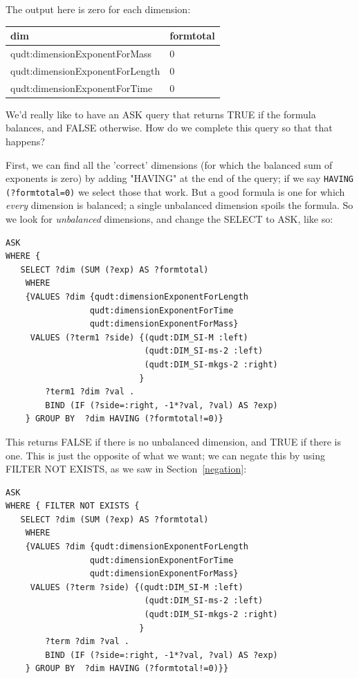 The output here is zero for each dimension:

\begin{tabular}{|ll|}
\hline
dim&formtotal\\
\hline
qudt:dimensionExponentForMass&0\\
qudt:dimensionExponentForLength&0\\
qudt:dimensionExponentForTime&0\\
\hline
\end{tabular}

We'd really like to have an ASK query that returns TRUE if the 
formula balances, and FALSE otherwise.  How do we complete this query so that 
that happens? 

First, we can find all the 'correct' dimensions (for which the balanced sum of 
exponents is zero) by adding "HAVING" at the end of the query; if we say \texttt{HAVING (?formtotal=0)} we
select those that work.  But a good formula is one for which \emph{every} dimension
is balanced; a single unbalanced dimension spoils the formula.  So we look for \emph{unbalanced} 
dimensions, and change the SELECT to ASK, like so:

\begin{lstlisting}
ASK
WHERE { 
   SELECT ?dim (SUM (?exp) AS ?formtotal)
    WHERE 
    {VALUES ?dim {qudt:dimensionExponentForLength 
                 qudt:dimensionExponentForTime 
                 qudt:dimensionExponentForMass}
     VALUES (?term1 ?side) {(qudt:DIM_SI-M :left)
                            (qudt:DIM_SI-ms-2 :left)
                            (qudt:DIM_SI-mkgs-2 :right)
                           }
        ?term1 ?dim ?val .
        BIND (IF (?side=:right, -1*?val, ?val) AS ?exp)
    } GROUP BY  ?dim HAVING (?formtotal!=0)}
\end{lstlisting}

This returns FALSE if there is no unbalanced dimension, and TRUE if there is one. 
This is just the opposite of what we want; we can negate this by using
FILTER NOT EXISTS, as we saw in Section~\ref{negation}:



\begin{lstlisting}
ASK  
WHERE { FILTER NOT EXISTS {
   SELECT ?dim (SUM (?exp) AS ?formtotal)
    WHERE 
    {VALUES ?dim {qudt:dimensionExponentForLength 
                 qudt:dimensionExponentForTime 
                 qudt:dimensionExponentForMass}
     VALUES (?term ?side) {(qudt:DIM_SI-M :left)
                            (qudt:DIM_SI-ms-2 :left)
                            (qudt:DIM_SI-mkgs-2 :right)
                           }
        ?term ?dim ?val .
        BIND (IF (?side=:right, -1*?val, ?val) AS ?exp)
    } GROUP BY  ?dim HAVING (?formtotal!=0)}}
\end{lstlisting}

